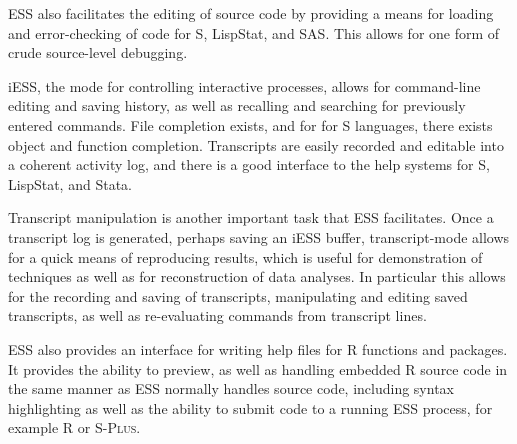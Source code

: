 \documentclass{article}
\newcommand*{\Splus}{\textsc{S-Plus}}
\begin{document}
ESS also facilitates the editing of source code by providing a means
for loading and error-checking of code for S, LispStat, and SAS.  This
allows for one form of crude source-level debugging.

iESS, the mode for controlling interactive processes, allows for
command-line editing and saving history, as well as recalling and
searching for previously entered commands.  File completion exists,
and for for S languages, there exists object and function completion.
Transcripts are easily recorded and editable into a coherent activity
log, and there is a good interface to the help systems for S,
LispStat, and Stata.

Transcript manipulation is another important task that ESS
facilitates.  Once a transcript log is generated, perhaps saving an
iESS buffer, transcript-mode allows for a quick means of reproducing
results, which is useful for demonstration of techniques as well as
for reconstruction of data analyses.  In particular this allows for
the recording and saving of transcripts, manipulating and editing
saved transcripts, as well as re-evaluating commands from transcript
lines. 

ESS also provides an interface for writing help files for R functions
and packages.    It provides the ability to preview, as well as
handling embedded R source code in the same manner as ESS normally
handles source code, including syntax highlighting as well as the
ability to submit code to a running ESS process, for example R or
\Splus. 
\end{document}
